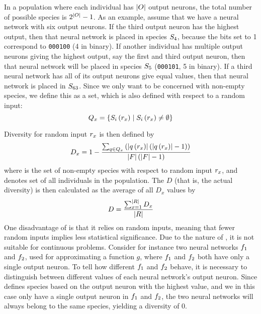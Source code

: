 In a population where each individual has $\lvert O\rvert$ output neurons, the total number of possible species is $2^{\lvert O\rvert} - 1$.  As an example, assume that we have a neural network with six output neurons. If the third output neuron has the highest output, then that neural network is placed in species $S_4$, because the bits set to 1 correspond to \texttt{000100} (4 in binary). If another individual has multiple output neurons giving the highest output, say the first and third output neuron, then that neural network will be placed in species $S_5$ (\texttt{000101}, 5 in binary). If a third neural network has all of its output neurons give equal values, then that neural network is placed in $S_{63}$.
Since we only want to be concerned with non-empty species, we define this as a set, which is also defined with respect to a random input:
\begin{equation*}\label{eq:nonemptyspecies}
  Q_{x} = \left\{ S_{i}\left(r_x\right) \mid S_{i}\left(r_x\right) \neq \emptyset \right\}
\end{equation*}

Diversity for random input $r_x$ is then defined by
%
\begin{equation*}\label{eq:sdi}
  D_x = 1 - \frac{\sum_{q \in Q_{x}}\left(\lvert q\left(r_x\right)\rvert\left(\lvert q\left(r_x\right)\rvert - 1\right)\right)}{\lvert F\rvert\left(\lvert F\rvert - 1\right)}
\end{equation*}
%
where  is the set of non-empty species with respect to random input $r_x$, and \indset{} denotes set of all individuals in the population. The \dia{} $D$ (that is, the actual diversity) is then calculated as the average of all \ransetl{} $D_x$ values by
%
\[
  D =\frac{\sum_{x=1}^{\lvert R\rvert}{D_x}}{\lvert R\rvert}
\]
%
One disadvantage of \dia{} is that it relies on random inputs, meaning that fewer random inputs implies less statistical significance. Due to the nature of \dia, it is not suitable for continuous problems. Consider for instance two neural networks $f_1$ and $f_2$, used for approximating a function $g$, where $f_1$ and $f_2$ both have only a single output neuron. To tell how different $f_1$ and $f_2$ behave, it is necessary to distinguish between different values of each neural network's output neuron. Since \dia{} defines species based on the output neuron with the highest value, and we in this case only have a single output neuron in $f_1$ and $f_2$, the two neural networks will always belong to the same species, yielding a diversity of 0.  
